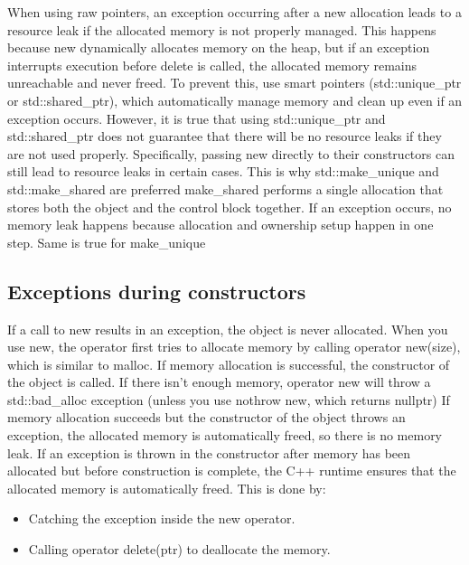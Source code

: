 \documentclass{report}
\begin{document}
    \pagebreak 
    \bigbreak \noindent 
    When using raw pointers, an exception occurring after a new allocation leads to a resource leak if the allocated memory is not properly managed. This happens because new dynamically allocates memory on the heap, but if an exception interrupts execution before delete is called, the allocated memory remains unreachable and never freed.
    \bigbreak \noindent 
    To prevent this, use smart pointers (std::unique\_ptr or std::shared\_ptr), which automatically manage memory and clean up even if an exception occurs.
    \bigbreak \noindent 
    However, it is true that using std::unique\_ptr and std::shared\_ptr does not guarantee that there will be no resource leaks if they are not used properly. Specifically, passing new directly to their constructors can still lead to resource leaks in certain cases. This is why std::make\_unique and std::make\_shared are preferred
    \bigbreak \noindent 
    make\_shared performs a single allocation that stores both the object and the control block together. If an exception occurs, no memory leak happens because allocation and ownership setup happen in one step.
    \bigbreak \noindent 
    Same is true for make\_unique
    \bigbreak \noindent 
    \subsection{Exceptions during constructors}
    \bigbreak \noindent 
    If a call to new results in an exception, the object is never allocated.
    When you use new, the operator first tries to allocate memory by calling operator new(size), which is similar to malloc.
    \bigbreak \noindent 
    If memory allocation is successful, the constructor of the object is called.
    \bigbreak \noindent 
    If there isn't enough memory, operator new will throw a std::bad\_alloc exception (unless you use nothrow new, which returns nullptr)
    \bigbreak \noindent 
    If memory allocation succeeds but the constructor of the object throws an exception, the allocated memory is automatically freed, so there is no memory leak. If an exception is thrown in the constructor after memory has been allocated but before construction is complete, the C++ runtime ensures that the allocated memory is automatically freed. This is done by:
    \begin{itemize}
        \item Catching the exception inside the new operator.
        \item Calling operator delete(ptr) to deallocate the memory.
    \end{itemize}
\end{document}
